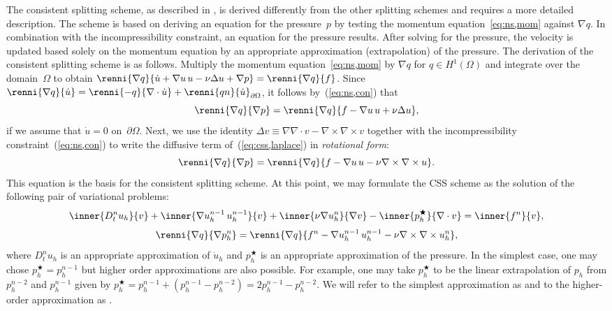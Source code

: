 The consistent splitting scheme, as described
in \citet{GuermondMinevShen2006,GuermondShen2003}, is derived
differently from the other splitting schemes and requires a more
detailed description. The scheme is based on deriving an equation for
the pressure~$p$ by testing the momentum equation~\eqref{eq:ns,mom}
against $\nabla q$.  In combination with the incompressibility
constraint, an equation for the pressure results. After solving for
the pressure, the velocity is updated based solely on the momentum
equation by an appropriate approximation (extrapolation) of the
pressure. The derivation of the consistent splitting scheme is as
follows. Multiply the momentum equation~\eqref{eq:ns,mom} by $\nabla
q$ for $q
\in H^1(\Omega)$ and integrate over the domain~$\Omega$ to obtain
$\renni{\nabla q}{\dot{u} + \nabla u \, u - \nu \Delta u + \nabla
  p} = \renni{\nabla q}{f}$. Since $\renni{\nabla q}{\dot{u}} =
\renni{-q}{\nabla \cdot \dot{u}} + \renni{qn}{\dot{u}}_{\partial
  \Omega}$, it follows by~(\ref{eq:ns,con}) that
\begin{equation}\label{eq:css,laplace}
  \renni{\nabla q}{\nabla p} = \renni{\nabla q}{f - \nabla u \, u +
    \nu \Delta u},
\end{equation}
if we assume that $\dot{u} = 0$ on~$\partial\Omega$. Next, we use the
identity $\Delta v \equiv \nabla \nabla \cdot v - \nabla \times \nabla
\times v$ together with the incompressibility
constraint~(\ref{eq:ns,con}) to write the diffusive term
of~(\ref{eq:css,laplace}) in
\emph{rotational form}:
\begin{equation}\label{eq:css,curl}
  \renni{\nabla q}{\nabla p} = \renni{\nabla q}{f - \nabla u \, u -
    \nu \nabla \times \nabla \times u}.
\end{equation}
This equation is the basis for the consistent splitting scheme. At
this point, we may formulate the CSS scheme as the solution of the
following pair of variational problems:
\begin{equation} \label{eq:css,u}
  \inner{D_t^n u_h}{v}
  + \inner{\nabla u_h^{n-1} \, u_h^{n-1}}{v}
  + \inner{\nu \nabla u_h^n}{\nabla v}
  - \inner{p_h^{\bigstar}}{\nabla \cdot v}
  = \inner{f^n}{v},
\end{equation}
\begin{equation} \label{eq:css,pn}
  \renni{\nabla q}{\nabla p_h^n} =
  \renni{\nabla q}{f^n -\nabla u_h^{n-1} \, u_h^{n-1} - \nu \nabla \times \nabla \times u_h^n},
\end{equation}
where $D_t^n u_h$ is an appropriate approximation of $\dot{u}_h$ and
$p^{\bigstar}_h$ is an appropriate approximation of the pressure. In
the simplest case, one may chose $p_h^{\bigstar} = p_h^{n-1}$ but
higher order approximations are also possible. For example, one may
take $p_h^{\bigstar}$ to be the linear extrapolation of $p_h$ from
$p_h^{n-2}$ and $p_h^{n-1}$ given by $p_h^{\bigstar} = p_h^{n-1} +
(p_h^{n-1} - p_h^{n-2}) = 2p_h^{n-1} - p_h^{n-2}$. We will refer to
the simplest approximation as  and to the higher-order
approximation as .

